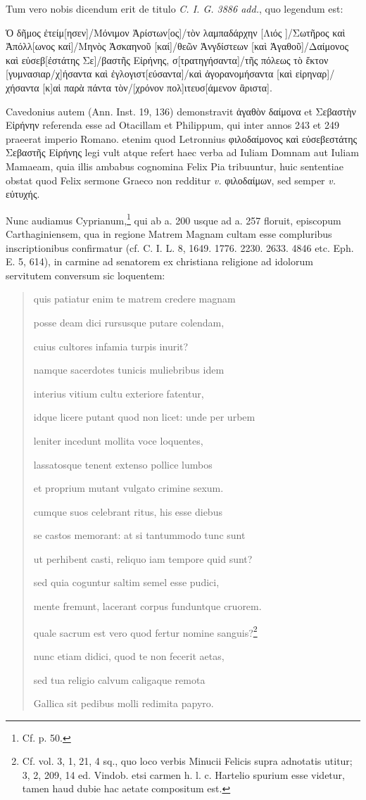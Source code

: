 \documentclass[a4paper, 11pt, oneside, polutonikogreek, german]{article}
\begin{document}
Tum vero nobis dicendum erit de titulo \emph{C. I. G. 3886 add.}, quo legendum est:

Ὁ δῆμος ἐτείμ[ησεν]/Μόνιμον Ἀρίστων[ος]/τὸν λαμπαδάρχην [Λιός ]/Σωτῆρος καὶ Ἀπόλλ[ωνος καί]/Μηνὸς Ἀσκαηνοῦ [καί]/θεῶν Ἀνγδίστεων [καὶ Ἀγαθοῦ]/Δαίμονος καὶ εὐσεβ[ἐστάτης Σε]/βαστῆς Εἰρήνης, σ[τρατηγήσαντα]/τῆς πόλεως τὸ ἔκτον [γυμνασιαρ/χ]ήσαντα καὶ ἐγλογιστ[εύσαντα]/καὶ ἀγορανομήσαντα [καὶ εἰρηναρ]/χήσαντα [κ]αἱ παρὰ πάντα τὸν/[χρόνον πολ]ιτευσ[άμενον ἂριστα].

Cavedonius autem (Ann. Inst. 19, 136) demonstravit ἀγαθὸν δαίμονα et Σεβαστὴν Εἰρήνην referenda esse ad Otacillam et Philippum, qui inter annos 243 et 249 praeerat imperio Romano. etenim quod Letronnius φιλοδαίμονος καὶ εὐσεβεστάτης Σεβαστῆς Εἰρήνης legi vult atque refert haec verba ad Iuliam Domnam aut Iuliam Mamaeam, quia illis ambabus cognomina Felix Pia tribuuntur, huic sententiae obstat quod Felix sermone Graeco non redditur \emph{v.} φιλοδαίμων, sed semper \emph{v.} εὐτυχής.

Nunc audiamus Cyprianum,\footnote{Cf. p. 50.} qui ab a. 200 usque ad a. 257 floruit, episcopum Carthaginiensem, qua in regione Matrem Magnam cultam esse compluribus inscriptionibus confirmatur (cf. C. I. L. 8, 1649. 1776. 2230. 2633. 4846 etc. Eph. E. 5, 614), in carmine ad senatorem ex christiana religione ad idolorum servitutem conversum sic loquentem:
\begin{quotation}
quis patiatur enim te matrem credere magnam

posse deam dici rursusque putare colendam,

cuius cultores infamia turpis inurit?

namque sacerdotes tunicis muliebribus idem

interius vitium cultu exteriore fatentur,

idque licere putant quod non licet: unde per urbem

leniter incedunt mollita voce loquentes,

lassatosque tenent extenso pollice lumbos

et proprium mutant vulgato crimine sexum.

cumque suos celebrant ritus, his esse diebus

se castos memorant: at si tantummodo tunc sunt

ut perhibent casti, reliquo iam tempore quid sunt?

sed quia coguntur saltim semel esse pudici,

mente fremunt, lacerant corpus funduntque cruorem.

quale sacrum est vero quod fertur nomine sanguis?\footnote{Cf. vol. 3, 1, 21, 4 sq., quo loco verbis Minucii Felicis supra adnotatis utitur; 3, 2, 209, 14 ed. Vindob. etsi carmen h. l. c. Hartelio spurium esse videtur, tamen haud dubie hac aetate compositum est.}

nunc etiam didici, quod te non fecerit aetas,

sed tua religio calvum caligaque remota

Gallica sit pedibus molli redimita papyro.
\end{quotation}
\end{document}
